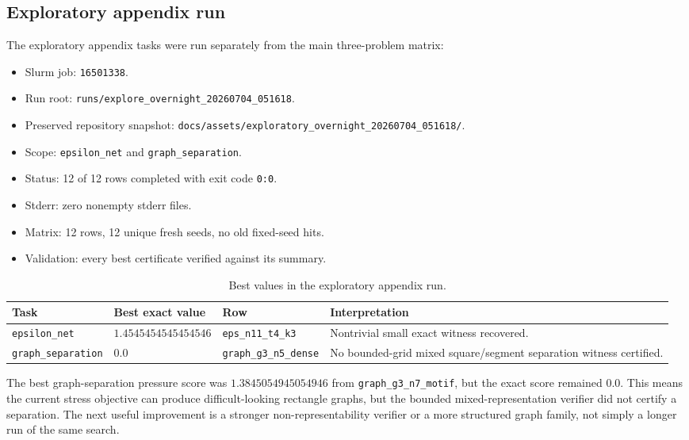 \documentclass[11pt]{article}
\newcommand{\code}[1]{\texttt{#1}}
\begin{document}
\subsection{Exploratory appendix run}

The exploratory appendix tasks were run separately from the main three-problem
matrix:
\begin{itemize}
\item Slurm job: \code{16501338}.
\item Run root: \code{runs/explore\_overnight\_20260704\_051618}.
\item Preserved repository snapshot:
\code{docs/assets/exploratory\_overnight\_20260704\_051618/}.
\item Scope: \code{epsilon\_net} and \code{graph\_separation}.
\item Status: 12 of 12 rows completed with exit code \code{0:0}.
\item Stderr: zero nonempty stderr files.
\item Matrix: 12 rows, 12 unique fresh seeds, no old fixed-seed hits.
\item Validation: every best certificate verified against its summary.
\end{itemize}

\begin{table}[htbp]
\centering
\caption{Best values in the exploratory appendix run.}
\begin{tabularx}{\textwidth}{p{}p{}p{}X}
\toprule
Task & Best exact value & Row & Interpretation \\
\midrule
\code{epsilon\_net} & $1.4545454545454546$ & \code{eps\_n11\_t4\_k3}
& Nontrivial small exact witness recovered. \\
\code{graph\_separation} & $0.0$ & \code{graph\_g3\_n5\_dense}
& No bounded-grid mixed square/segment separation witness certified. \\
\bottomrule
\end{tabularx}
\end{table}

The best graph-separation pressure score was $1.3845054945054946$ from
\code{graph\_g3\_n7\_motif}, but the exact score remained $0.0$.  This means
the current stress objective can produce difficult-looking rectangle graphs,
but the bounded mixed-representation verifier did not certify a separation.
The next useful improvement is a stronger non-representability verifier or a
more structured graph family, not simply a longer run of the same search.
\end{document}
